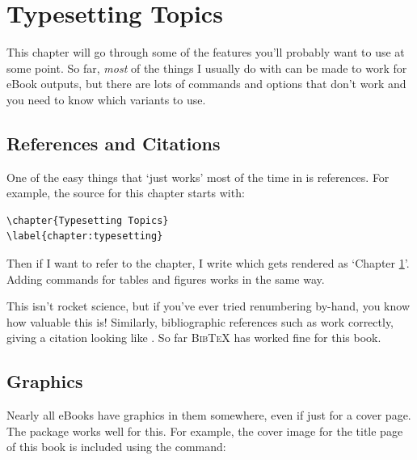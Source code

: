 \chapter{Typesetting Topics}
\label{chapter:typesetting}

This chapter will go through some of the \tex features you'll probably want to use at some point.
So far, {\em most} of the things I usually do with \tex can be made to work for eBook outputs,
but there are lots of commands and options that don't work and you need to know which
variants to use.

\section{References and Citations}

One of the easy things that `just works' most of the time in \latex is references. For example,
the \tex source for this chapter starts with:

\begin{verbatim}
\chapter{Typesetting Topics}
\label{chapter:typesetting}
\end{verbatim}

Then if I want to refer to the chapter, I write  which
gets rendered as `Chapter \ref{chapter:typesetting}'. Adding  commands for tables and figures
works in the same way.

This isn't rocket science, but if you've ever tried
renumbering by-hand, you know how valuable this is! Similarly, bibliographic references such as
 work correctly, giving a citation looking like \cite{knuth1984texbook}.
So far \textsc{BibTeX} has worked fine for this book.

\section{Graphics}

Nearly all eBooks have graphics in them somewhere, even if just for a cover page. 
The  package works well for this.
For example, the cover image for the title page of this book is included using the command:

